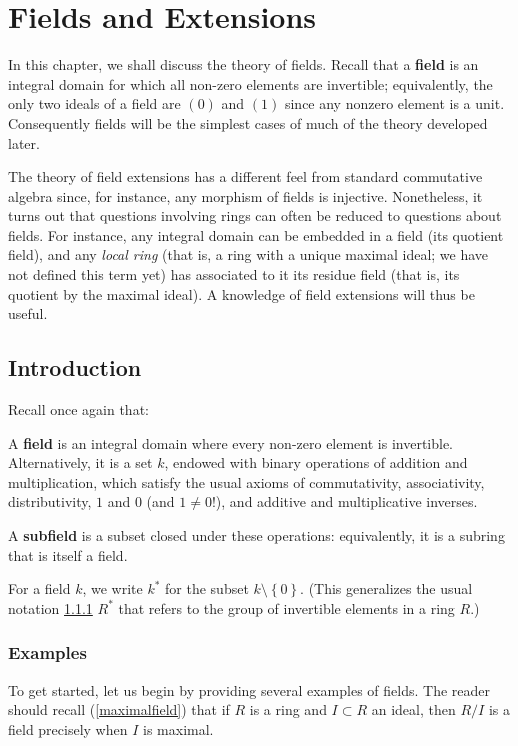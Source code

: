 \chapter{Fields and Extensions}

In this chapter, we shall discuss the theory of fields.
Recall that a \textbf{field} is an integral domain for which all non-zero elements are
invertible; equivalently, the only two ideals of a field are $(0)$ and $(1)$
since any nonzero element is a unit. Consequently fields will be the
simplest cases of much of the theory developed later. 

The theory of field extensions has a different feel from standard commutative
algebra since, for instance, any morphism of fields is injective. Nonetheless,
it turns out that questions involving rings can often be reduced to questions
about fields. For instance, any integral domain can be embedded in a field
(its quotient field), and any \emph{local ring} (that is, a ring with a unique
maximal ideal; we have not defined this term yet) has associated to it its
residue field (that is, its quotient by the maximal ideal).
A knowledge of field extensions will thus be useful.

\section{Introduction}


Recall once again that:
\begin{definition} 
A \textbf{field} is an integral domain where every non-zero element is
invertible. Alternatively, it is a set $k$, endowed with binary operations of
addition and multiplication, which satisfy the usual axioms of commutativity,
associativity, distributivity, $1$ and $0$ (and $1 \neq 0$!), and additive and
multiplicative inverses.
\end{definition} 

A \textbf{subfield} is a subset closed under these operations: equivalently, it
is a subring that is itself a field.

For a field $k$, we write $k^*$ for the subset $k  \setminus \left\{0\right\}$.
(This generalizes the usual notation \cref{} $R^*$ that refers to the group of
invertible elements in a ring $R$.)

\subsection{Examples}
To get started, let us begin by providing several examples of fields. The reader should
recall (\cref{maximalfield}) that if $R$ is a ring and $I \subset R$ an
ideal, then $R/I$ is a field precisely when $I$ is maximal.


